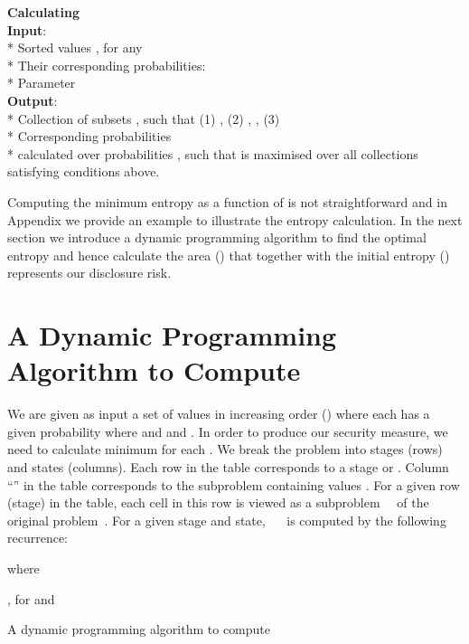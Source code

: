 \documentclass{llncs}
\begin{document}
\textbf{Calculating }\\
\textbf{ Input}:\\
* Sorted values  ,  for any \\
* Their corresponding probabilities: \\
* Parameter   \\
\textbf{Output}:\\
* Collection  of subsets ,  such that (1) ,  (2) , , (3) \\
* Corresponding probabilities \\
*  calculated over probabilities , such that  is maximised over all collections    satisfying conditions above.


Computing the minimum entropy  as a function of
 is not straightforward and in Appendix
we provide an example to illustrate the entropy calculation.
In the next section we introduce a dynamic programming algorithm to find
the optimal entropy and hence calculate the area () that
together with the initial entropy () represents our
disclosure risk.

\section{A Dynamic Programming Algorithm to Compute~}


We are given as input a set of values  in increasing order
() where each  has a given
probability  where  and and .
In order to produce our security measure, we need to calculate
minimum  for each . We
break the problem into stages (rows) and states (columns). Each
row in the table corresponds to a stage or . Column ``''
in the table corresponds to  the subproblem containing values
. For a given row (stage) in the
table, each cell in this row is viewed as a subproblem
~~of the original
problem~. For a given stage and state,
~~ is computed by the following
recurrence:


\noindent
where 
\begin{center}
,  for   and  
\end{center}
 
 






\begin{algorithm}[H] \footnotesize
  \SetLine
  \KwOut{}

  \;

  \caption{A dynamic programming algorithm to compute~}\label{algorithm:DPALGO1}
\end{algorithm}
\end{document}
